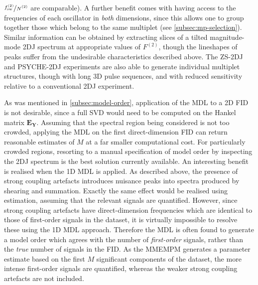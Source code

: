 $\nicefrac{\fswtwo}{\Ntwo}$ are comparable).
A further benefit comes with having access to the frequencies of each
oscillator in \emph{both} dimensions, since this allows one to group together
those which belong to the same multiplet (see \cref{subsec:mp-selection}).
Similar information can be obtained
by extracting slices of a tilted magnitude-mode \ac{2DJ} spectrum at
appropriate values of $F^{(2)}$, though the lineshapes of peaks suffer from the
undesirable characteristics described above. The
\ac{ZS}-\ac{2DJ}\cite{Pell2007} and
\ac{PSYCHE}-\ac{2DJ}\cite{Foroozandeh2015,Kiraly2017} experiments are also able
to generate individual multiplet structures, though with long \ac{3D} pulse
sequences, and with reduced sensitivity relative to a conventional \ac{2DJ}
experiment.

As was mentioned in \cref{subsec:model-order}, application of the
\ac{MDL} to a \ac{2D} \ac{FID} is not desirable, since a full \ac{SVD} would
need to be computed on the Hankel matrix $\symbf{E}_{\symbf{Y}}$.
Assuming that the spectral region being considered is not too
crowded, applying the \ac{MDL} on the first direct-dimension \ac{FID} can
return reasonable estimates of $M$ at a far smaller computational cost. For
particularly crowded regions, resorting to a manual specification of model
order by inspecting the \ac{2DJ} spectrum is the best solution currently
available.
An interesting benefit is realised when the \ac{1D} \ac{MDL} is applied.
As described above, the presence of strong coupling artefacts introduces
nuisance peaks into spectra produced by shearing and summation. Exactly the
same effect would be realised using estimation, assuming
that the relevant signals are quantified. However, since strong coupling
artefacts have direct-dimension frequencies which are identical to those of
first-order signals in the dataset, it is virtually impossible to resolve these
using the \ac{1D} \ac{MDL} approach. Therefore the \ac{MDL} is often found to
generate a model order which agrees with the number of \emph{first-order} signals,
rather than the \emph{true} number of signals in the \ac{FID}. As the
\ac{MMEMPM} generates a parameter estimate based on the first $M$ significant
components of the dataset, the more intense first-order signals are quantified,
whereas the weaker strong coupling artefacts are not included.

